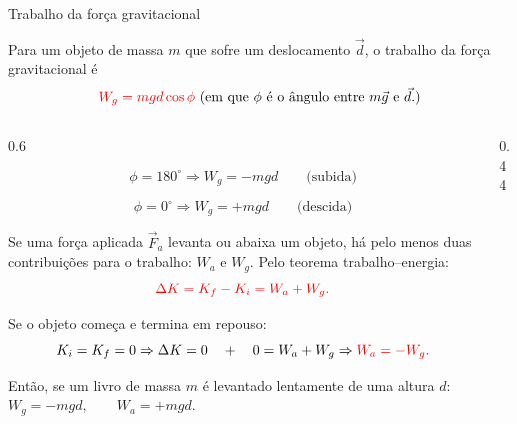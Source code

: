 \documentclass{beamer}
\begin{document}
	\begin{frame}{Trabalho da força gravitacional}
		\scriptsize
		
		Para um objeto de massa \(m\) que sofre um deslocamento \(\vec d\), o trabalho da força gravitacional é
		\[
		\textcolor{red}{W_g=mgd\cos\phi} \text{ (em que \(\phi\) é o ângulo entre \(m\vec g\) e \(\vec d\).)}
		\]
		
		\begin{columns}[T]
			\begin{column}{0.6\textwidth}
				
				\[
				\phi=180^\circ
				\Rightarrow 
				W_g=-mgd
				\qquad \text{(subida)}
				\]
				
				\[
				\phi=0^\circ
				\Rightarrow 
				W_g=+mgd
				\qquad \text{(descida)}
				\]
				
				\vspace{0.15cm}
				
				Se uma força aplicada \(\vec F_a\) levanta ou abaixa um objeto, há pelo menos duas contribuições para o trabalho:
				$
				W_a  \text{ e } W_g.
				$
				Pelo teorema trabalho--energia:
				\[
				\textcolor{red}{\Delta K=K_f-K_i=W_a+W_g.}
				\]
				
				Se o objeto começa e termina em repouso:
				\[
				K_i=K_f=0
				\Rightarrow 
				\Delta K=0 \quad + \quad
				0=W_a+W_g
				\Rightarrow 
				\textcolor{red}{W_a=-W_g.}
				\]
				
				Então, se um livro de massa \(m\) é levantado lentamente de uma altura \(d\): \(W_g=-mgd,\qquad W_a=+mgd.\)
			\end{column}
			
			\begin{column}{0.44\textwidth}
				\centering
				

\end{column}
\end{columns}
\end{frame}
\end{document}
